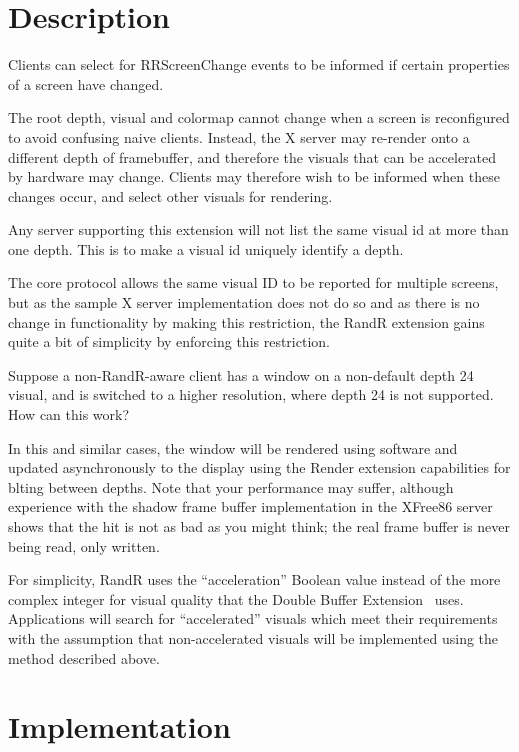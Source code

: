 \documentclass[twocolumn]{article}
\begin{document}
\section{Description}

Clients can select for RRScreenChange events to be informed if certain
properties of a screen have changed.

The root depth, visual and colormap cannot change when a screen is
reconfigured to avoid confusing naive clients. Instead, the X server
may re-render onto a different depth of framebuffer, and therefore the
visuals that can be accelerated by hardware may change. Clients may
therefore wish to be informed when these changes occur, and select
other visuals for rendering.

Any server supporting this extension will not list the same visual id
at more than one depth. This is to make a visual id uniquely identify
a depth.

The core protocol allows the same visual ID to be reported for
multiple screens, but as the sample X server implementation does not
do so and as there is no change in functionality by making this
restriction, the RandR extension gains quite a bit of simplicity by
enforcing this restriction.

Suppose a non-RandR-aware client has a window on a non-default depth
24 visual, and is switched to a higher resolution, where depth 24 is
not supported.  How can this work?  

In this and similar cases, the window will be rendered using software
and updated asynchronously to the display using the Render extension
capabilities for blting between depths.  Note that your performance
may suffer, although experience with the shadow frame buffer
implementation in the XFree86 server shows that the hit is
not as bad as you might think; the real frame buffer is never being
read, only written.

For simplicity, RandR uses the ``acceleration'' Boolean value instead of the
more complex integer for visual quality that the Double Buffer
Extension~\cite{dbe} uses.
Applications will search for ``accelerated'' visuals which meet their
requirements with the assumption that non-accelerated visuals will be
implemented using the method described above.

\section{Implementation}
\end{document}
